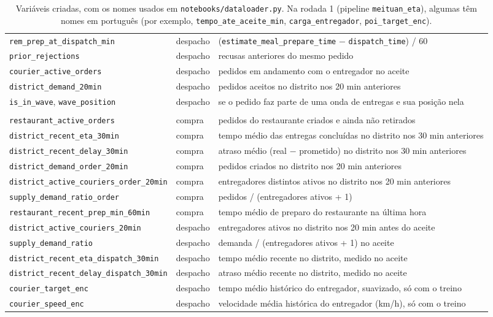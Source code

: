 \documentclass[11pt,a4paper]{article}
\begin{document}
\begin{table}[H]
\begin{tabularx}{\linewidth}{>{\raggedright\arraybackslash}p{5.6cm} l L}
\texttt{rem\_prep\_at\_dispatch\_min} & despacho & (\texttt{estimate\_meal\_prepare\_time} $-$ \texttt{dispatch\_time}) / 60 \\
\texttt{prior\_rejections} & despacho & recusas anteriores do mesmo pedido \\
\texttt{courier\_active\_orders} & despacho & pedidos em andamento com o entregador no aceite \\
\texttt{district\_demand\_20min} & despacho & pedidos aceitos no distrito nos 20 min anteriores \\
\texttt{is\_in\_wave}, \texttt{wave\_position} & despacho & se o pedido faz parte de uma onda de entregas e sua posição nela \\
\midrule
{} \\
\texttt{restaurant\_active\_orders} & compra & pedidos do restaurante criados e ainda não retirados \\
\texttt{district\_recent\_eta\_30min} & compra & tempo médio das entregas concluídas no distrito nos 30 min anteriores \\
\texttt{district\_recent\_delay\_30min} & compra & atraso médio (real $-$ prometido) no distrito nos 30 min anteriores \\
\texttt{district\_demand\_order\_20min} & compra & pedidos criados no distrito nos 20 min anteriores \\
\texttt{district\_active\_couriers\_order\_20min} & compra & entregadores distintos ativos no distrito nos 20 min anteriores \\
\texttt{supply\_demand\_ratio\_order} & compra & pedidos / (entregadores ativos + 1) \\
\texttt{restaurant\_recent\_prep\_min\_60min} & compra & tempo médio de preparo do restaurante na última hora \\
\texttt{district\_active\_couriers\_20min} & despacho & entregadores ativos no distrito nos 20 min antes do aceite \\
\texttt{supply\_demand\_ratio} & despacho & demanda / (entregadores ativos + 1) no aceite \\
\texttt{district\_recent\_eta\_dispatch\_30min} & despacho & tempo médio recente no distrito, medido no aceite \\
\texttt{district\_recent\_delay\_dispatch\_30min} & despacho & atraso médio recente no distrito, medido no aceite \\
\texttt{courier\_target\_enc} & despacho & tempo médio histórico do entregador, suavizado, só com o treino \\
\texttt{courier\_speed\_enc} & despacho & velocidade média histórica do entregador (km/h), só com o treino \\
\bottomrule
\end{tabularx}
\caption{Variáveis criadas, com os nomes usados em \texttt{notebooks/dataloader.py}. Na rodada 1
(pipeline \texttt{meituan\_eta}), algumas têm nomes em português (por exemplo,
\texttt{tempo\_ate\_aceite\_min}, \texttt{carga\_entregador}, \texttt{poi\_target\_enc}).}
\label{tab:dic-var}
\end{table}
\end{document}
